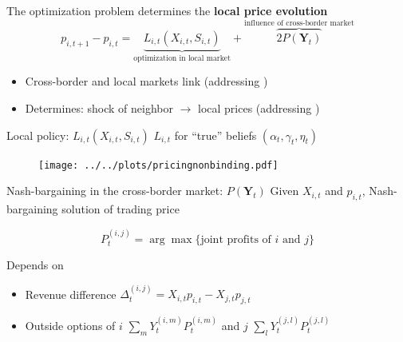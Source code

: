 \documentclass{beamer}
\newcommand{\matr}[1]{\bm{#1}}
\newcommand{\Y}{\matr{Y}}
\begin{document}
\begin{frame}

    The optimization problem determines the \textbf{local price evolution}
    \begin{equation*}
        p_{i, t+1} - p_{i, t} = \underbrace{L_{i, t}(X_{i, t}, S_{i, t})}_{\text{optimization in local market}} + \overbrace{2 P(\Y_t)}^{\text{influence of cross-border market}}
    \end{equation*}

    \begin{itemize} \setlength\itemsep{1.5em}
        \item Cross-border and local markets link (addressing \citeauthor{Gebhardt2013})
        \item Determines: shock of neighbor $\xrightarrow{}$ local prices (addressing \citeauthor{Bockers2014})
    \end{itemize}

\end{frame}

\begin{frame}{Local policy: $L_{i, t}(X_{i, t}, S_{i, t})$}
    $L_{i, t}$ for ``true'' beliefs $(\alpha_t, \gamma_t, \eta_t)$
    \begin{figure}
        \texttt{[image: ../../plots/pricingnonbinding.pdf]}
    \end{figure}
\end{frame}

\begin{frame}{Nash-bargaining in the cross-border market: $P(\Y_t)$}
    Given $X_{i, t}$ and $p_{i, t}$, Nash-bargaining solution of trading price

    \begin{equation*}
        P_t^{(i, j)} = \arg \max \{  \text{joint profits of $i$ and $j$} \}
    \end{equation*}

    Depends on

    \begin{itemize} \setlength\itemsep{1.5em}
        \item Revenue difference $\Delta^{(i, j)}_t = X_{i, t} p_{i, t} - X_{j, t} p_{j, t} $
        \item Outside options of $i$ $\sum_m Y_t^{(i, m)} P_t^{(i, m)}$ and $j$ $\sum_l Y_t^{(j, l)} P_t^{(j, l)}$
    \end{itemize}

\end{frame}
\end{document}
